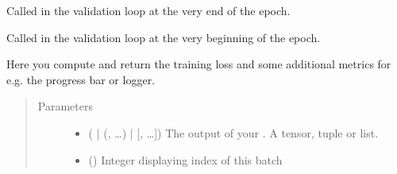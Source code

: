 \documentclass[letterpaper,10pt,english]{sphinxmanual}
\begin{document}
\begin{fulllineitems}
\begin{fulllineitems}
\label{\detokenize{pages/ml:vipercore.ml.plmodels.GeneralModel.on_validation_epoch_end}}
\sphinxAtStartPar
Called in the validation loop at the very end of the epoch.

\end{fulllineitems}


\begin{fulllineitems}
\label{\detokenize{pages/ml:vipercore.ml.plmodels.GeneralModel.on_validation_epoch_start}}
\sphinxAtStartPar
Called in the validation loop at the very beginning of the epoch.

\end{fulllineitems}


\begin{fulllineitems}
\label{\detokenize{pages/ml:vipercore.ml.plmodels.GeneralModel.training_step}}
\sphinxAtStartPar
Here you compute and return the training loss and some additional metrics for e.g.
the progress bar or logger.
\begin{quote}\begin{description}
\item[{Parameters}] \leavevmode\begin{itemize}
\item {} 
\sphinxAtStartPar
{} ( | (, …) | {[}, …{]}) \textendash{} The output of your . A tensor, tuple or list.

\item {} 
\sphinxAtStartPar
{} () \textendash{} Integer displaying index of this batch


\end{itemize}
\end{description}
\end{quote}
\end{fulllineitems}
\end{fulllineitems}
\end{document}
